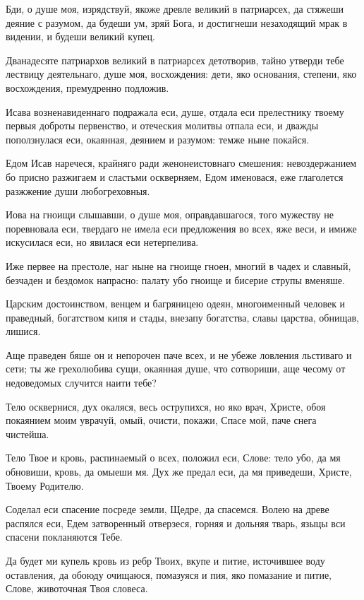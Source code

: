 Бди, о душе моя, изрядствуй, якоже древле великий в патриарсех, да стяжеши деяние с разумом, да будеши ум, зряй Бога, и достигнеши незаходящий мрак в видении, и будеши великий купец.

Дванадесяте патриархов великий в патриарсех детотворив, тайно утверди тебе лествицу деятельнаго, душе моя, восхождения: дети, яко основания, степени, яко восхождения, премудренно подложив.

Исава возненавиденнаго подражала еси, душе, отдала еси прелестнику твоему первыя доброты первенство, и отеческия молитвы отпала еси, и дважды поползнулася еси, окаянная, деянием и разумом: темже ныне покайся.

Едом Исав наречеся, крайняго ради женонеистовнаго смешения: невоздержанием бо присно разжигаем и сластьми оскверняем, Едом именовася, еже глаголется разжжение души любогреховныя.

Иова на гноищи слышавши, о душе моя, оправдавшагося, того мужеству не поревновала еси, твердаго не имела еси предложения во всех, яже веси, и имиже искусилася еси, но явилася еси нетерпелива.

Иже первее на престоле, наг ныне на гноище гноен, многий в чадех и славный, безчаден и бездомок напрасно: палату убо гноище и бисерие струпы вменяше.

Царским достоинством, венцем и багряницею одеян, многоименный человек и праведный, богатством кипя и стады, внезапу богатства, славы царства, обнищав, лишися.

Аще праведен бяше он и непорочен паче всех, и не убеже ловления льстиваго и сети; ты же грехолюбива сущи, окаянная душе, что сотвориши, аще чесому от недоведомых случится наити тебе?

Тело осквернися, дух окаляся, весь острупихся, но яко врач, Христе, обоя покаянием моим уврачуй, омый, очисти, покажи, Спасе мой, паче снега чистейша.

Тело Твое и кровь, распинаемый о всех, положил еси, Слове: тело убо, да мя обновиши, кровь, да омыеши мя. Дух же предал еси, да мя приведеши, Христе, Твоему Родителю.

Соделал еси спасение посреде земли, Щедре, да спасемся. Волею на древе распялся еси, Едем затворенный отверзеся, горняя и дольняя тварь, языцы вси спасени покланяются Тебе.

Да будет ми купель кровь из ребр Твоих, вкупе и питие, источившее воду оставления, да обоюду очищаюся, помазуяся и пия, яко помазание и питие, Слове, животочная Твоя словеса.

